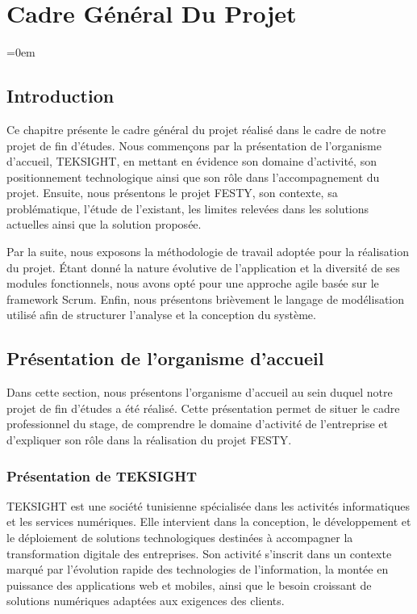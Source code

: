 \chapter{Cadre Général Du Projet}
\begingroup
\parindent=0em
\localtableofcontents
\endgroup
\newpage

\section{Introduction}
Ce chapitre présente le cadre général du projet réalisé dans le cadre de notre projet de fin d’études. Nous commençons par la présentation de l’organisme d’accueil, TEKSIGHT, en mettant en évidence son domaine d’activité, son positionnement technologique ainsi que son rôle dans l’accompagnement du projet. Ensuite, nous présentons le projet FESTY, son contexte, sa problématique, l’étude de l’existant, les limites relevées dans les solutions actuelles ainsi que la solution proposée.

Par la suite, nous exposons la méthodologie de travail adoptée pour la réalisation du projet. Étant donné la nature évolutive de l’application et la diversité de ses modules fonctionnels, nous avons opté pour une approche agile basée sur le framework Scrum. Enfin, nous présentons brièvement le langage de modélisation utilisé afin de structurer l’analyse et la conception du système.

\section{Présentation de l’organisme d’accueil}
Dans cette section, nous présentons l’organisme d’accueil au sein duquel notre projet de fin d’études a été réalisé. Cette présentation permet de situer le cadre professionnel du stage, de comprendre le domaine d’activité de l’entreprise et d’expliquer son rôle dans la réalisation du projet FESTY.

\subsection{Présentation de TEKSIGHT}
TEKSIGHT est une société tunisienne spécialisée dans les activités informatiques et les services numériques. Elle intervient dans la conception, le développement et le déploiement de solutions technologiques destinées à accompagner la transformation digitale des entreprises. Son activité s’inscrit dans un contexte marqué par l’évolution rapide des technologies de l’information, la montée en puissance des applications web et mobiles, ainsi que le besoin croissant de solutions numériques adaptées aux exigences des clients.

